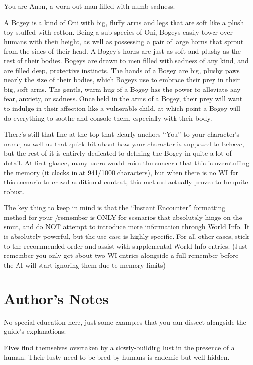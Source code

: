 \documentclass[Coomer-main.tex]{subfiles}
\begin{document}
\begin{/rm}
You are Anon, a worn-out man filled with numb sadness.

A Bogey is a kind of Oni with big, fluffy arms and legs that are soft like a plush toy stuffed with cotton. Being a sub-species of Oni, Bogeys easily tower over humans with their height, as well as possessing a pair of large horns that sprout from the sides of their head. A Bogey's horns are just as soft and plushy as the rest of their bodies. Bogeys are drawn to men filled with sadness of any kind, and are filled deep, protective instincts. The hands of a Bogey are big, plushy paws nearly the size of their bodies, which Bogeys use to embrace their prey in their big, soft arms. The gentle, warm hug of a Bogey has the power to alleviate any fear, anxiety, or sadness. Once held in the arms of a Bogey, their prey will want to indulge in their affection like a vulnerable child, at which point a Bogey will do everything to soothe and console them, especially with their body.
\end{/rm}

There’s still that line at the top that clearly anchors “You” to your character’s name, as well as that quick bit about how your character is supposed to behave, but the rest of it is entirely dedicated to defining the Bogey in quite a lot of detail. At first glance, many users would raise the concern that this is overstuffing the memory (it clocks in at 941/1000 characters), but when there is no WI for this scenario to crowd additional context, this method actually proves to be quite robust.

The key thing to keep in mind is that the “Instant Encounter” formatting method for your /remember is ONLY for scenarios that absolutely hinge on the smut, and do NOT attempt to introduce more information through World Info. It is absolutely powerful, but the use case is highly specific. For all other cases, stick to the recommended order and assist with supplemental World Info entries. (Just remember you only get about two WI entries alongside a full remember before the AI will start ignoring them due to memory limits)

\section{Author’s Notes}

No special education here, just some examples that you can dissect alongside the guide’s explanations:

\begin{/an}
Elves find themselves overtaken by a slowly-building lust in the presence of a human. Their lusty need to be bred by humans is endemic but well hidden.
\end{/an}
\end{document}

